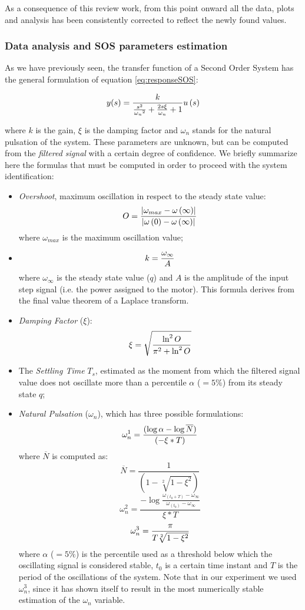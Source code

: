 As a consequence of this review work, from this point onward all the data, plots and analysis has been consistently corrected to reflect the newly found values. 


\subsubsection{Data analysis and SOS parameters estimation}

As we have previously seen, the transfer function of a Second Order System has the general formulation of equation \ref{eq:responseSOS}:

\[
  y(s) = {{k \over {{s^2 \over {{\omega_n}^2}} + {2s{\xi} \over
        {\omega_n}} + 1}}u\left (s\right )}
\]

where $k$ is the gain, $\xi$ is the damping factor and $\omega_n$ stands for the natural pulsation of the system. These parameters are unknown, but can be computed from the \textit{filtered signal} with a certain degree of confidence. We briefly summarize here the formulas that must be computed in order to proceed with the system identification:

\begin{itemize}
\item \emph{Overshoot}, maximum oscillation in respect to the steady state value:
\[
  O = {{\left \vert {\omega_{max} - \omega\left (\infty \right )}\right
    \vert} \over {\left \vert {\omega \left (0\right ) - \omega \left
          (\infty \right )}\right \vert}}
\]
where $\omega_{max}$ is the maximum oscillation value;
\item
\[
  k = {\omega_{\infty} \over A}
\]
where $\omega_{\infty}$ is the steady state value ($q$) and $A$ is the amplitude of the input step signal (i.e. the power assigned to the motor). This formula derives from the final value theorem of a Laplace transform.
\item \emph{Damping Factor} ($\xi$):
\[
  \xi = {\sqrt{{\ln^2 O} \over {\pi^2 + \ln^2 O}}}
\]
\item The \emph{Settling Time} $T_s$, estimated as the moment from which the filtered signal value does not oscillate more than a percentile $\alpha{}$ ($=5\%$) from its steady state $q$;
\item \emph{Natural Pulsation} ($\omega_n$), which has three possible formulations:
\[
  \omega_n^1 = {{(\log{\alpha{}} - \log{\overline{N}})}\over{(-\xi * T)}}
\]
where \emph{$\overline{N}$} is computed as: 
\[
	\overline{N} = \frac{1}{(1 - \sqrt[2]{1 - \xi^2})}
\]
\[
  \omega_n^2 = \frac{- \log{\frac{\omega_{(t_0 + T)} - \omega_\infty}{\omega_{(t_0)} - \omega_\infty }}}{\xi * T}
\]
\[
  \omega_n^3 = {{\pi} \over {T\sqrt[2]{1-\xi^2}}}
\]
where $\alpha{}$ ($= 5\%$) is the percentile used as a threshold below which the oscillating signal is considered stable, $t_0$ is a certain time instant and $T$ is the period of the oscillations of the system. Note that in our experiment we used $\omega_n^3$, since it has shown itself to result in the most numerically stable estimation of the $\omega_n$ variable.
\end{itemize}

